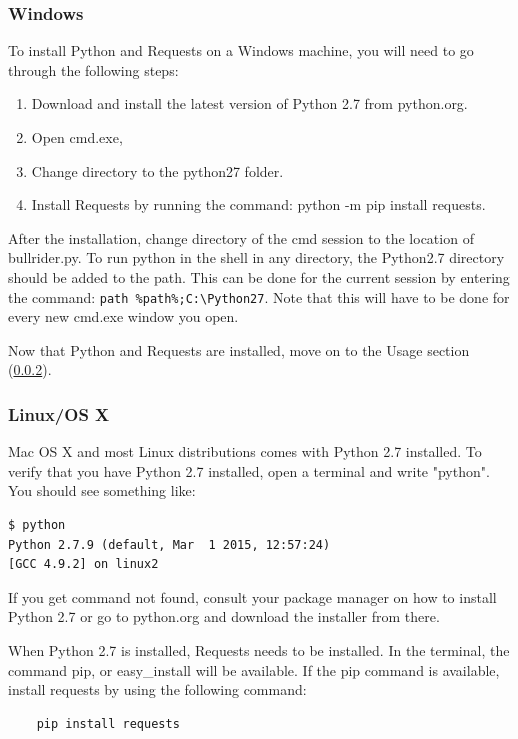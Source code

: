 \subsubsection{Windows}
To install Python and Requests on a Windows machine, you will need to go through the following steps:

\begin{enumerate}
\setlength{\itemsep}{0cm}%
    \item Download and install the latest version of Python 2.7 from python.org.
    \item Open cmd.exe,
    \item Change directory to the python27 folder. 
    \item Install Requests by running the command: python -m pip install requests.
\end{enumerate}

After the installation, change directory of the cmd session to the location of bullrider.py. To run python in the shell in any directory, the Python2.7 directory should be added to the path. This can be done for the current session by entering the command: \verb!path %path%;C:\Python27!.
Note that this will have to be done for every new cmd.exe window you open.

Now that Python and Requests are installed, move on to the Usage section (\ref{}).

\subsubsection{Linux/OS X}
Mac OS X and most Linux distributions comes with Python 2.7 installed. To verify that you have Python 2.7 installed, open a terminal and write "python". You should see something like:
\begin{verbatim}
$ python
Python 2.7.9 (default, Mar  1 2015, 12:57:24)
[GCC 4.9.2] on linux2
\end{verbatim}

If you get command not found, consult your package manager on how to install Python 2.7 or go to python.org and download the installer from there.

When Python 2.7 is installed, Requests needs to be installed. In the terminal, the command pip, or easy\_install will be available. If the pip command is available, install requests by using the following command:

\begin{verbatim}
    pip install requests
\end{verbatim}

